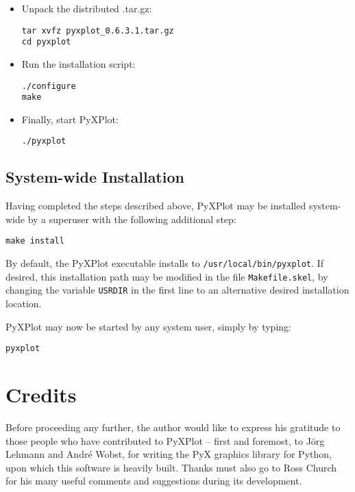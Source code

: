 \begin{itemize}
\item Unpack the distributed .tar.gz:

\begin{verbatim}
tar xvfz pyxplot_0.6.3.1.tar.gz
cd pyxplot
\end{verbatim}

\item Run the installation script:

\begin{verbatim}
./configure
make
\end{verbatim}

\item Finally, start PyXPlot:

\begin{verbatim}
./pyxplot
\end{verbatim}

\end{itemize}

\subsection{System-wide Installation}

Having completed the steps described above, PyXPlot may be installed
system-wide by a superuser with the following additional step:

\begin{verbatim}
make install
\end{verbatim}

By default, the PyXPlot executable installs to \texttt{/usr/local/bin/pyxplot}.
If desired, this installation path may be modified in the file
\texttt{Makefile.skel}, by changing the variable \texttt{USRDIR} in the first
line to an alternative desired installation location.

PyXPlot may now be started by any system user, simply by typing:

\begin{verbatim}
pyxplot
\end{verbatim}

\section{Credits}

Before proceeding any further, the author would like to express his gratitude
to those people who have contributed to PyXPlot -- first and foremost, to
J\"org Lehmann and Andr\'e Wobst, for writing the PyX graphics library for
Python, upon which this software is heavily built. Thanks must also go to Ross
Church for his many useful comments and suggestions during its development.

